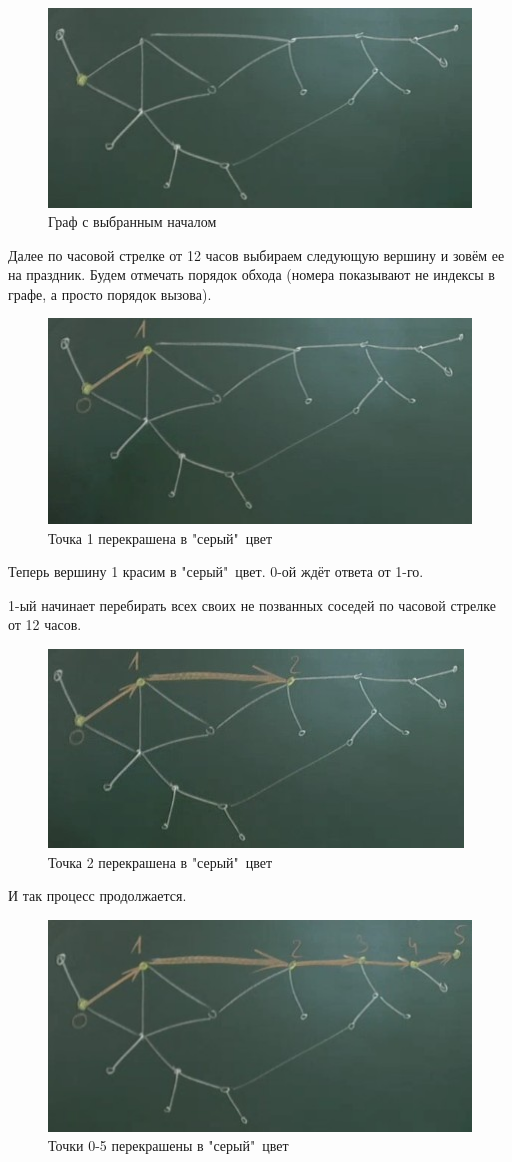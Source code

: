 \documentclass[a4paper,12pt]{article}
\theoremstyle{plain} %
\theoremstyle{definition} %
\theoremstyle{remark} %
\begin{document}
\begin{figure}[h!]
	\centering
	\includegraphics[width=0.5\linewidth]{alg1}
	\caption{Граф с выбранным началом}
\end{figure}
Далее по часовой стрелке от 12 часов выбираем следующую вершину и зовём ее на праздник. Будем отмечать порядок обхода (номера показывают не индексы в графе, а просто порядок вызова).

\begin{figure}[h!]
	\centering
	\includegraphics[width=0.5\linewidth]{alg2}
	\caption{Точка 1 перекрашена в "серый"\ цвет}
\end{figure}

Теперь вершину 1 красим в "серый"\ цвет. 0-ой ждёт ответа от 1-го.

1-ый начинает перебирать всех своих не позванных соседей по часовой стрелке от 12 часов.
\vspace{10cm}

\begin{figure}[h!]
	\centering
	\includegraphics[width=0.5\linewidth]{alg3}
	\caption{Точка 2 перекрашена в "серый"\ цвет}
\end{figure}

И так процесс продолжается.
\begin{figure}[h!]
	\centering
	\includegraphics[width=0.5\linewidth]{alg4}
	\caption{Точки 0-5 перекрашены в "серый"\ цвет}
\end{figure}
\end{document}

